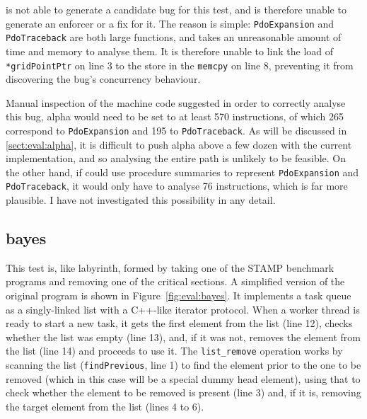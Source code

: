 {\Implementation} is not able to generate a candidate bug for this
test, and is therefore unable to generate an enforcer or a fix for it.
The reason is simple: \texttt{PdoExpansion} and \texttt{PdoTraceback}
are both large functions, and {\implementation} takes an unreasonable
amount of time and memory to analyse them.  It is therefore unable to
link the load of \texttt{*gridPointPtr} on line 3 to the store in the
\texttt{memcpy} on line 8, preventing it from discovering the bug's
concurrency behaviour.

Manual inspection of the machine code suggested in order to correctly
analyse this bug, \gls{alpha} would need to be set to at least 570
instructions, of which 265 correspond to \texttt{PdoExpansion} and 195
to \texttt{PdoTraceback}.  As will be discussed in
\autoref{sect:eval:alpha}, it is difficult to push \gls{alpha} above a
few dozen with the current implementation, and so analysing the entire
path is unlikely to be feasible.  On the other hand, if {\technique}
could use procedure summaries\needCite{} to represent
\texttt{PdoExpansion} and \texttt{PdoTraceback}, it would only have to
analyse 76 instructions, which is far more plausible.  I have not
investigated this possibility in any detail.

\subsection{bayes}

This test is, like labyrinth, formed by taking one of the STAMP
benchmark programs and removing one of the critical sections.  A
simplified version of the original program is shown in
Figure~\ref{fig:eval:bayes}.  It implements a task queue as a
singly-linked list with a C++-like iterator protocol\needCite{}.  When
a worker thread is ready to start a new task, it gets the first
element from the list (line 12), checks whether the list was empty
(line 13), and, if it was not, removes the element from the list (line
14) and proceeds to use it.  The \texttt{list\_remove} operation works
by scanning the list (\texttt{findPrevious}, line 1) to find the
element prior to the one to be removed (which in this case will be a
special dummy head element), using that to check whether the element
to be removed is present (line 3) and, if it is, removing the target
element from the list (lines 4 to 6).

